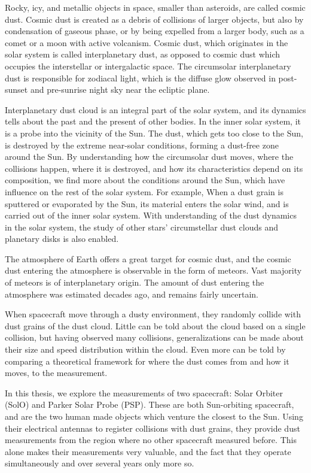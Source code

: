 
Rocky, icy, and metallic objects in space, smaller than asteroids, are called cosmic dust. Cosmic dust is created as a debris of collisions of larger objects, but also by condensation of gaseous phase, or by being expelled from a larger body, such as a comet or a moon with active volcanism. Cosmic dust, which originates in the solar system is called interplanetary dust, as opposed to cosmic dust which occupies the interstellar or intergalactic space. The circumsolar interplanetary dust is responsible for zodiacal light, which is the diffuse glow observed in post-sunset and pre-sunrise night sky near the ecliptic plane.

Interplanetary dust cloud is an integral part of the solar system, and its dynamics tells about the past and the present of other bodies. In the inner solar system, it is a probe into the vicinity of the Sun. The dust, which gets too close to the Sun, is destroyed by the extreme near-solar conditions, forming a dust-free zone around the Sun. By understanding how the circumsolar dust moves, where the collisions happen, where it is destroyed, and how its characteristics depend on its composition, we find more about the conditions around the Sun, which have influence on the rest of the solar system. For example, When a dust grain is sputtered or evaporated by the Sun, its material enters the solar wind, and is carried out of the inner solar system. With understanding of the dust dynamics in the solar system, the study of other stars' circumstellar dust clouds and planetary disks is also enabled.

The atmosphere of Earth offers a great target for cosmic dust, and the cosmic dust entering the atmosphere is observable in the form of meteors. Vast majority of meteors is of interplanetary origin. The amount of dust entering the atmosphere was estimated decades ago, and remains fairly uncertain. 

When spacecraft move through a dusty environment, they randomly collide with dust grains of the dust cloud. Little can be told about the cloud based on a single collision, but having observed many collisions, generalizations can be made about their size and speed distribution within the cloud. Even more can be told by comparing a theoretical framework for where the dust comes from and how it moves, to the measurement. 

In this thesis, we explore the measurements of two spacecraft: Solar Orbiter (SolO) and Parker Solar Probe (PSP). These are both Sun-orbiting spacecraft, and are the two human made objects which venture the closest to the Sun. Using their electrical antennas to register collisions with dust grains, they provide dust measurements from the region where no other spacecraft measured before. This alone makes their measurements very valuable, and the fact that they operate simultaneously and over several years only more so.

